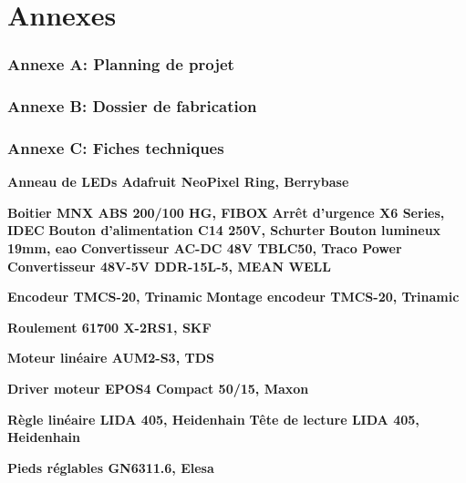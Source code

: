 \section*{Annexes}

\subsubsection*{Annexe A: Planning de projet}

\subsubsection*{Annexe B: Dossier de fabrication}

\subsubsection*{Annexe C: Fiches techniques}

\textbf{Anneau de LEDs Adafruit NeoPixel Ring, Berrybase}

\textbf{Boitier MNX ABS 200/100 HG, FIBOX}
\newline \textbf{Arrêt d'urgence X6 Series, IDEC}
\newline \textbf{Bouton d'alimentation C14 250V, Schurter}
\newline \textbf{Bouton lumineux 19mm, eao}
\newline \textbf{Convertisseur AC-DC 48V TBLC50, Traco Power}
\newline \textbf{Convertisseur 48V-5V DDR-15L-5, MEAN WELL}

\textbf{Encodeur TMCS-20, Trinamic}
\newline
\textbf{Montage encodeur TMCS-20, Trinamic}

\textbf{Roulement 61700 X-2RS1, SKF}

\textbf{Moteur linéaire AUM2-S3, TDS}

\textbf{Driver moteur EPOS4 Compact 50/15, Maxon}

\textbf{Règle linéaire LIDA 405, Heidenhain}
\newline
\textbf{Tête de lecture LIDA 405, Heidenhain}

\textbf{Pieds réglables GN6311.6, Elesa}

\iffalse

    

